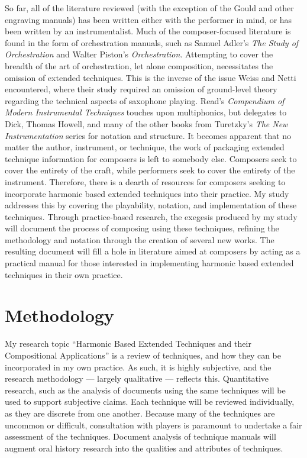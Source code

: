 So far, all of the literature reviewed (with the exception of the Gould and other engraving manuals) has been written either with the performer in mind, or has been written by an instrumentalist. 
Much of the composer-focused literature is found in the form of orchestration manuals, such as Samuel Adler’s \emph{The Study of Orchestration} and Walter Piston’s \emph{Orchestration}.\autocite{adlerStudyOrchestration2002, pistonOrchestration1969} 
Attempting to cover the breadth of the art of orchestration, let alone composition, necessitates the omission of extended techniques. 
This is the inverse of the issue Weiss and Netti encountered, where their study required an omission of ground-level theory regarding the technical aspects of saxophone playing. 
Read’s \emph{Compendium of Modern Instrumental Techniques} touches upon multiphonics, but delegates to Dick, Thomas Howell, and many of the other books from Turetzky’s \emph{The New Instrumentation} series for notation and structure.\autocite[160]{readCompendiumModernInstrumental1993} 
It becomes apparent that no matter the author, instrument, or technique, the work of packaging extended technique information for composers is left to somebody else. 
Composers seek to cover the entirety of the craft, while performers seek to cover the entirety of the instrument. 
Therefore, there is a dearth of resources for composers seeking to incorporate harmonic based extended techniques into their practice. 
My study addresses this by covering the playability, notation, and implementation of these techniques. 
Through practice-based research, the exegesis produced by my study will document the process of composing using these techniques, refining the methodology and notation through the creation of several new works. 
The resulting document will fill a hole in literature aimed at composers by acting as a practical manual for those interested in implementing harmonic based extended techniques in their own practice.


\newpage

\section{Methodology}
My research topic “Harmonic Based Extended Techniques and their Compositional Applications” is a review of techniques, and how they can be incorporated in my own practice. 
As such, it is highly subjective, and the research methodology --- largely qualitative --- reflects this. 
Quantitative research, such as the analysis of documents using the same techniques will be used to support subjective claims. 
Each technique will be reviewed individually, as they are discrete from one another. 
Because many of the techniques are uncommon or difficult, consultation with players is paramount to undertake a fair assessment of the techniques. 
Document analysis of technique manuals will augment oral history research into the qualities and attributes of techniques.

